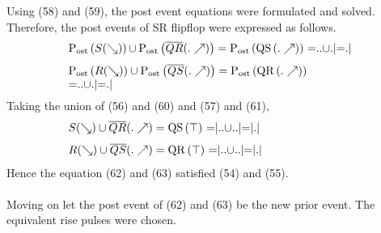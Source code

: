 \documentclass[10pt,journal]{IEEEtran}
\begin{document}
Using (58) and (59), the post event equations     were formulated and solved. Therefore, the post events of SR flipflop     were expressed as follows.
\begin{equation}
 \begin{minipage}{250pt}
\begin{flushleft} $\displaystyle \operatorname{P_{ost}}{\left(S{\left(\searrow \right)} \right)} \cup \operatorname{P_{ost}}{\left(\overline{QR}{\left(.\nearrow \right)} \right)} = \operatorname{P_{ost}}{\left(\operatorname{QS}{\left(.\nearrow \right)} \right)}$  =$..$$\cup$$.|$=$.|$\end{flushleft}
 \end{minipage}
 \end{equation}
\begin{equation}
 \begin{minipage}{250pt}
\begin{flushleft} $\displaystyle \operatorname{P_{ost}}{\left(R{\left(\searrow \right)} \right)} \cup \operatorname{P_{ost}}{\left(\overline{QS}{\left(.\nearrow \right)} \right)} = \operatorname{P_{ost}}{\left(\operatorname{QR}{\left(.\nearrow \right)} \right)}$  =$..$$\cup$$.|$=$.|$\end{flushleft}
 \end{minipage}
 \end{equation}
Taking the union of (56) and (60) and (57) and (61), 
\begin{equation}
 \begin{minipage}{250pt}
\begin{flushleft} $\displaystyle S{\left(\searrow \right)} \cup \overline{QR}{\left(.\nearrow \right)} = \operatorname{QS}{\left(\top \right)}$  =$|..$$\cup$$..|$=$|.|$\end{flushleft}
 \end{minipage}
 \end{equation}
\begin{equation}
 \begin{minipage}{250pt}
\begin{flushleft} $\displaystyle R{\left(\searrow \right)} \cup \overline{QS}{\left(.\nearrow \right)} = \operatorname{QR}{\left(\top \right)}$  =$|..$$\cup$$..|$=$|.|$\end{flushleft}
 \end{minipage}
 \end{equation}
Hence the equation (62) and (63) satisfied  (54) and (55). \\ \ \\     Moving on let the post event of (62) and (63) be the new prior event. The equivalent rise pulses were chosen. 
\end{document}
